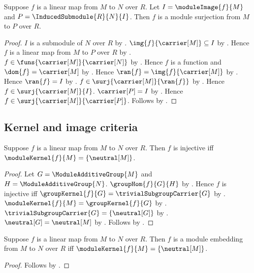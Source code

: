 \begin{theorem}\label{module_image_corestriction_is_surjection}
    Suppose $f$ is a linear map from $M$ to $N$ over $R$.
    Let $I=\moduleImage{f}{M}$ and
        $P=\InducedSubmodule{R}{N}{I}$.
    Then $f$ is a module surjection from $M$ to $P$ over $R$.
\end{theorem}
\begin{proof}
    $I$ is a submodule of $N$ over $R$ by
        .
    $\img{f}{\carrier[M]}\subseteq I$ by
        .
    Hence $f$ is a linear map from $M$ to $P$ over $R$ by
        .
    $f\in\funs{\carrier[M]}{\carrier[N]}$ by
        .
    Hence $f$ is a function and $\dom{f}=\carrier[M]$ by
        .
    Hence $\ran{f}=\img{f}{\carrier[M]}$ by .
    Hence $\ran{f}=I$ by .
    $f\in\surj{\carrier[M]}{\ran{f}}$ by
        .
    Hence $f\in\surj{\carrier[M]}{I}$.
    $\carrier[P]=I$ by .
    Hence $f\in\surj{\carrier[M]}{\carrier[P]}$.
    Follows by .
\end{proof}

\subsection{Kernel and image criteria}

\begin{theorem}\label{linear_map_injective_iff_kernel_zero}
    Suppose $f$ is a linear map from $M$ to $N$ over $R$.
    Then $f$ is injective iff
        $\moduleKernel{f}{M}=\{\neutral[M]\}$.
\end{theorem}
\begin{proof}
    Let $G=\ModuleAdditiveGroup{M}$ and
        $H=\ModuleAdditiveGroup{N}$.
    $\groupHom{f}{G}{H}$ by
        .
    Hence $f$ is injective iff
        $\groupKernel{f}{G}=\trivialSubgroupCarrier{G}$ by
        .
    $\moduleKernel{f}{M}=\groupKernel{f}{G}$ by
        .
    $\trivialSubgroupCarrier{G}=\{\neutral[G]\}$ by
        .
    $\neutral[G]=\neutral[M]$ by
        .
    Follows by \auto.
\end{proof}

\begin{corollary}\label{module_embedding_iff_kernel_zero}
    Suppose $f$ is a linear map from $M$ to $N$ over $R$.
    Then $f$ is a module embedding from $M$ to $N$ over $R$ iff
        $\moduleKernel{f}{M}=\{\neutral[M]\}$.
\end{corollary}
\begin{proof}
    Follows by
        .
\end{proof}

